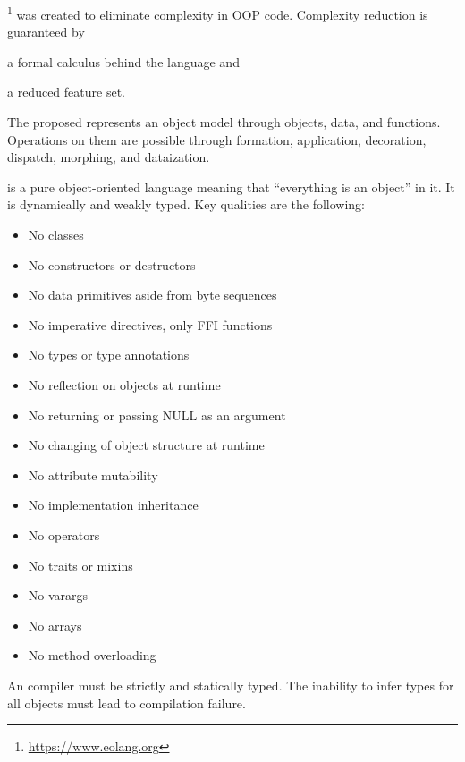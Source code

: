 
\eolang{}\footnote{\url{https://www.eolang.org}} was created to eliminate complexity in OOP code.
Complexity reduction is guaranteed by
\begin{inparaenum}[1)]
  \item a formal calculus behind the language
  and
  \item a reduced feature set.
\end{inparaenum}
The proposed \phic{} represents an object model through objects, data, and functions.
Operations on them are possible through formation, application, decoration, dispatch, morphing, and dataization.

\eolang{} is a pure object-oriented language meaning that ``everything is an object'' in it.
It is dynamically and weakly typed.
Key qualities are the following:

\begin{itemize}
  \item No classes
  \item No constructors or destructors
  \item No data primitives aside from byte sequences
  \item No imperative directives, only FFI functions
  \item No types or type annotations
  \item No reflection on objects at runtime
  \item No returning or passing NULL as an argument
  \item No changing of object structure at runtime
  \item No attribute mutability
  \item No implementation inheritance
  \item No operators
  \item No traits or mixins
  \item No varargs
  \item No arrays
  \item No method overloading
\end{itemize}

An \eolang{} compiler must be strictly and statically typed.
The inability to infer types for all objects must lead to compilation failure.
